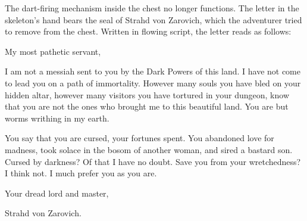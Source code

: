 The dart-firing mechanism inside the chest no longer functions. The letter in the skeleton's hand bears the
seal of Strahd von Zarovich, which the adventurer tried to remove from the chest. Written in flowing script,
the letter reads as follows:
\begin{handout}
  My most pathetic servant,
  
  I am not a messiah sent to you by the Dark Powers of this land. I have not come to lead you on a path of
  immortality. However many souls you have bled on your hidden altar, however many visitors you have tortured
  in your dungeon, know that you are not the ones who brought me to this beautiful land. You are but worms
  writhing in my earth.
  
  You say that you are cursed, your fortunes spent. You abandoned love for madness, took solace in the bosom
  of another woman, and sired a bastard son. Cursed by darkness? Of that I have no doubt. Save you from your
  wretchedness? I think not. I much prefer you as you are.
  
  Your dread lord and master,
  
  Strahd von Zarovich.
\end{handout}

